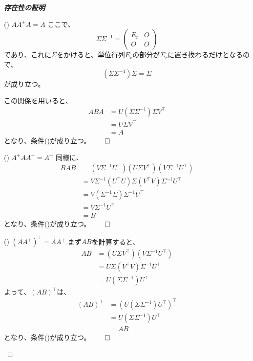 \documentclass[../../../topic_linear-algebra]{subfiles}
\begin{document}
\begin{proof}[\bfseries 存在性の証明]
\begin{subpattern}{() $AA^+A = A$}
      ここで、
      \begin{equation*}
        \Sigma \Sigma^{-1} = \begin{pmatrix}
          E_r & O \\
          O & O
        \end{pmatrix}
      \end{equation*}
      であり、これに$\Sigma$をかけると、単位行列$E_r$の部分が$\Sigma_r$に置き換わるだけとなるので、
      \begin{equation*}
        (\Sigma \Sigma^{-1}) \Sigma = \Sigma
      \end{equation*}
      が成り立つ。
      
      \br
      
      この関係を用いると、
      \begin{align*}
        ABA &= U(\Sigma \Sigma^{-1}) \Sigma V^\top \\
              &= U \Sigma V^\top \\
              &= A
      \end{align*}
      となり、条件()が成り立つ。$\qed$
    \end{subpattern}
    
    \begin{subpattern}{() $A^+AA^+ = A^+$}
      同様に、
      \begin{align*}
        B A B &= (V \Sigma^{-1} U^\top)(U \Sigma V^\top)(V \Sigma^{-1} U^\top) \\
              &= V \Sigma^{-1} (U^\top U) \Sigma (V^\top V) \Sigma^{-1} U^\top \\
              &= V(\Sigma^{-1} \Sigma) \Sigma^{-1} U^\top \\
              &= V \Sigma^{-1} U^\top \\
              &= B
      \end{align*}
      となり、条件()が成り立つ。$\qed$
    \end{subpattern}
    
    \begin{subpattern}{() $(AA^+)^\top = AA^+$}
      まず$AB$を計算すると、
      \begin{align*}
        AB & = (U \Sigma V^\top)(V \Sigma^{-1} U^\top) \\
           & = U \Sigma (V^\top V) \Sigma^{-1} U^\top \\
           & = U(\Sigma \Sigma^{-1}) U^\top 
      \end{align*}
      よって、$(AB)^\top$は、
      \begin{align*}
        (AB)^\top & = (U(\Sigma \Sigma^{-1}) U^\top)^\top \\
                  & = U (\Sigma \Sigma^{-1}) U^\top \\
                  & = AB
      \end{align*}
      となり、条件()が成り立つ。$\qed$
    \end{subpattern}
    

\end{proof}
\end{document}
